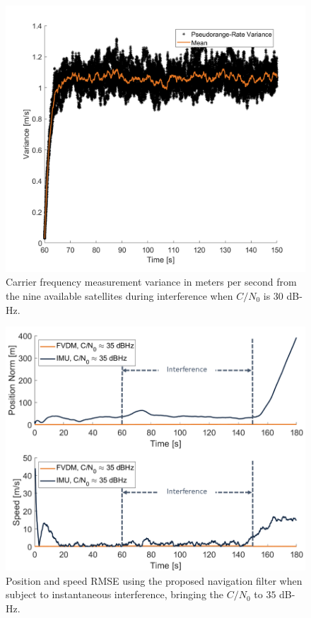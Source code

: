 \documentclass[12pt]{report}
\begin{document}
\begin{figure}[!ht]
  \centering
  \includegraphics[width=0.75\linewidth]{Figures/Results/Scenario1/Case30/carrierVariance.png}
  \caption{Carrier frequency measurement variance in meters per second from the nine available satellites during interference when \(C/N_0\) is \(30\) dB-Hz.}\label{fig:carrierVariance30}
\end{figure}

\begin{figure}[!ht]
  \centering
  \includegraphics[width=0.75\linewidth]{Figures/Results/trajectoryfigure/Slide18.PNG}
  \caption{Position and speed RMSE using the proposed navigation filter when subject to instantaneous interference, bringing the \(C/N_0\) to \(35\) dB-Hz.}\label{fig:PosVel35}
\end{figure}
\end{document}
